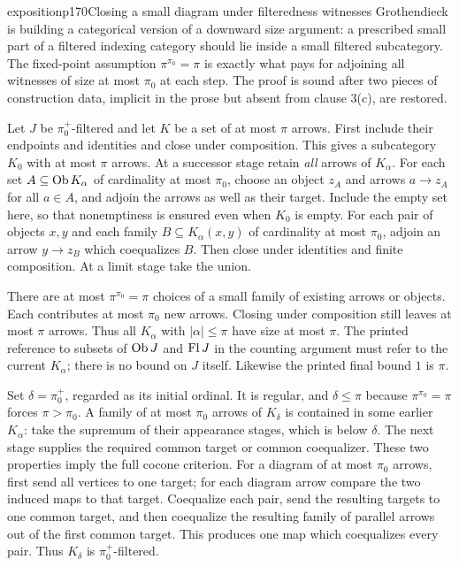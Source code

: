 \begin{dcomment}{exposition}{p170}{Closing a small diagram under filteredness witnesses}
Grothendieck is building a categorical version of a downward size argument: a prescribed small part of a filtered indexing category should lie inside a small filtered subcategory. The fixed-point assumption $\pi^{\pi_0}=\pi$ is exactly what pays for adjoining all witnesses of size at most $\pi_0$ at each step. The proof is sound after two pieces of construction data, implicit in the prose but absent from clause 3(c), are restored.

Let $J$ be $\pi_0^+$-filtered and let $K$ be a set of at most $\pi$ arrows. First include their endpoints and identities and close under composition. This gives a subcategory $K_0$ with at most $\pi$ arrows. At a successor stage retain \emph{all} arrows of $K_\alpha$. For each set $A\subseteq\operatorname{Ob} K_\alpha$ of cardinality at most $\pi_0$, choose an object $z_A$ and arrows $a\to z_A$ for all $a\in A$, and adjoin the arrows as well as their target. Include the empty set here, so that nonemptiness is ensured even when $K_0$ is empty. For each pair of objects $x,y$ and each family $B\subseteq K_\alpha(x,y)$ of cardinality at most $\pi_0$, adjoin an arrow $y\to z_B$ which coequalizes $B$. Then close under identities and finite composition. At a limit stage take the union.

There are at most $\pi^{\pi_0}=\pi$ choices of a small family of existing arrows or objects. Each contributes at most $\pi_0$ new arrows. Closing under composition still leaves at most $\pi$ arrows. Thus all $K_\alpha$ with $|\alpha|\leq\pi$ have size at most $\pi$. The printed reference to subsets of $\operatorname{Ob} J$ and $\operatorname{Fl} J$ in the counting argument must refer to the current $K_\alpha$; there is no bound on $J$ itself. Likewise the printed final bound $1$ is $\pi$.

Set $\delta=\pi_0^+$, regarded as its initial ordinal. It is regular, and $\delta\leq\pi$ because $\pi^{\pi_0}=\pi$ forces $\pi>\pi_0$. A family of at most $\pi_0$ arrows of $K_\delta$ is contained in some earlier $K_\alpha$: take the supremum of their appearance stages, which is below $\delta$. The next stage supplies the required common target or common coequalizer. These two properties imply the full cocone criterion. For a diagram of at most $\pi_0$ arrows, first send all vertices to one target; for each diagram arrow compare the two induced maps to that target. Coequalize each pair, send the resulting targets to one common target, and then coequalize the resulting family of parallel arrows out of the first common target. This produces one map which coequalizes every pair. Thus $K_\delta$ is $\pi_0^+$-filtered.


\end{dcomment}
